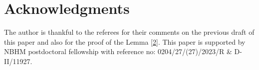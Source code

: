 \documentclass{aic}
\begin{document}





\section*{Acknowledgments} %
The author is thankful to the referees for their comments on the previous draft of this paper and also for the proof of the Lemma \ref{2}. This paper is supported by NBHM postdoctoral fellowship with reference no: 0204/27/(27)/2023/R \& D-II/11927.
\end{document}
